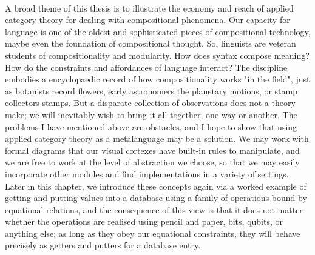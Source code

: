 \\
A broad theme of this thesis is to illustrate the economy and reach of applied category theory for dealing with compositional phenomena. Our capacity for language is one of the oldest and sophisticated pieces of compositional technology, maybe even the foundation of compositional thought. So, linguists are veteran students of compositionality and modularity. How does syntax compose meaning? How do the constraints and affordances of language interact? The discipline embodies a encyclopaedic record of how compositionality works "in the field", just as botanists record flowers, early astronomers the planetary motions, or stamp collectors stamps. But a disparate collection of observations does not a theory make; we will inevitably wish to bring it all together, one way or another. The problems I have mentioned above are obstacles, and I hope to show that using applied category theory as a metalanguage may be a solution. We may work with formal diagrams that our visual cortexes have built-in rules to manipulate, and we are free to work at the level of abstraction we choose, so that we may easily incorporate other modules and find implementations in a variety of settings. Later in this chapter, we introduce these concepts again via a worked example of getting and putting values into a database using a family of operations bound by equational relations, and the consequence of this view is that it does not matter whether the operations are realised using pencil and paper, bits, qubits, or anything else; as long as they obey our equational constraints, they will behave precisely as getters and putters for a database entry.


